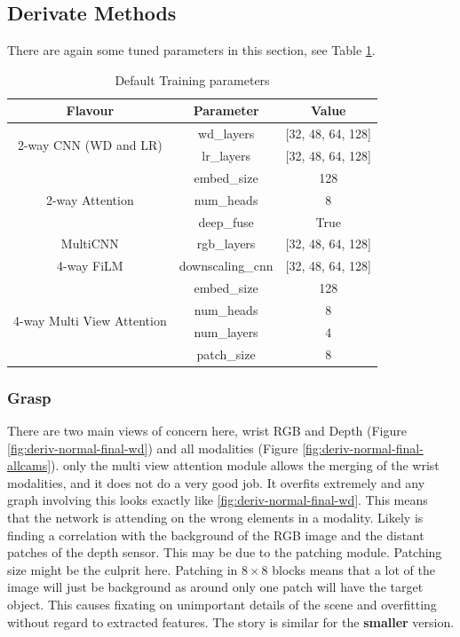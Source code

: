 \subsection{Derivate Methods}
There are again some tuned parameters in this section, see Table \ref{tab:derivative-params}.

\begin{table}[H]
\centering
  \begin{tabular}{|| c  c  c ||}
  \hline
  Flavour & Parameter & Value \\
  \hline
  \multirow{2}{*}{2-way CNN (WD and LR)} & wd\_layers & [32, 48, 64, 128]\\
  & lr\_layers & [32, 48, 64, 128]\\
  \hline
  \multirow{3}{*}{2-way Attention} & embed\_size & 128 \\
  & num\_heads & 8 \\
  & deep\_fuse & True \\
  \hline
  \multirow{1}{*}{MultiCNN} & rgb\_layers & [32, 48, 64, 128] \\
  \hline
  \multirow{1}{*}{4-way FiLM} & downscaling\_cnn & [32, 48, 64, 128] \\
  \hline
  \multirow{4}{*}{4-way Multi View Attention} & embed\_size & 128 \\
  & num\_heads & 8 \\
  & num\_layers & 4 \\
  & patch\_size & 8 \\
  \hline
  \end{tabular}\caption{Default Training parameters}\label{tab:derivative-params}
\end{table}

\subsubsection{Grasp}
There are two main views of concern here, wrist RGB and Depth (Figure \ref{fig:deriv-normal-final-wd}) and all modalities (Figure \ref{fig:deriv-normal-final-allcams}). only the multi view attention module allows the merging of the wrist modalities, and it does not do a very good job. It overfits extremely and any graph involving this looks exactly like \ref{fig:deriv-normal-final-wd}. This means that the network is attending on the wrong elements in a modality. Likely is finding a correlation with the background of the RGB image and the distant patches of the depth sensor. This may be due to the patching module. Patching size might be the culprit here. Patching in \(8 \times 8\) blocks means that a lot of the image will just be background as around only one patch will have the target object. This causes fixating on unimportant details of the scene and overfitting without regard to extracted features. The story is similar for the \textbf{smaller} version.

